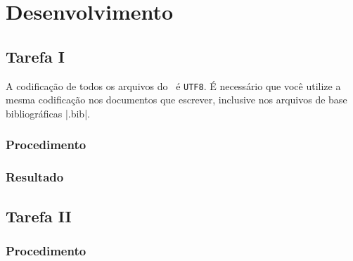 

\chapter{Desenvolvimento}

\section{Tarefa I}

A codifica\c{c}\~{a}o de todos os arquivos do \abnTeX\ \'{e} \texttt{UTF8}. \'{E} necess\'{a}rio que
voc\^{e} utilize a mesma codifica\c{c}\~{a}o nos documentos que escrever, inclusive nos
arquivos de base bibliogr\'{a}ficas |.bib|.

\subsection{Procedimento}
\subsection{Resultado}

\section{Tarefa II}

\subsection{Procedimento}
